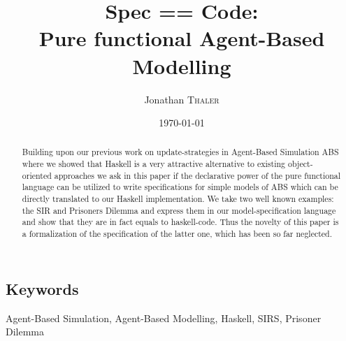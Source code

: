 \documentclass{article}
\title{Spec == Code:\\Pure functional Agent-Based Modelling} %
\author{Jonathan \textsc{Thaler}} %
\date{\today} %
\begin{document}
\maketitle %

\begin{abstract}
Building upon our previous work on update-strategies in Agent-Based Simulation ABS where we showed that Haskell is a very attractive alternative to existing object-oriented approaches we ask in this paper if the declarative power of the pure functional language can be utilized to write specifications for simple models of ABS which can be directly translated to our Haskell implementation. We take two well known examples: the SIR and Prisoners Dilemma and express them in our model-specification language and show that they are in fact equals to haskell-code. Thus the novelty of this paper is a formalization of the specification of the latter one, which has been so far neglected.
\end{abstract}

\subsection*{Keywords}
Agent-Based Simulation, Agent-Based Modelling, Haskell, SIRS, Prisoner Dilemma













 







\newpage



\end{document}
